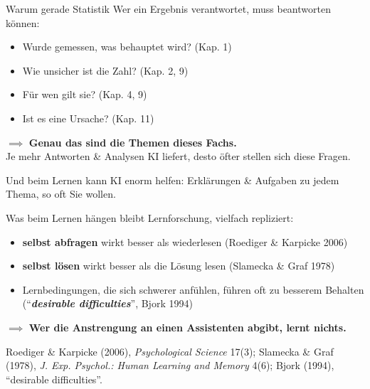 \documentclass[
  10pt,
  ignorenonframetext,
]{beamer}
\providecommand{\tightlist}{%
  \setlength{\itemsep}{0pt}\setlength{\parskip}{0pt}}
\begin{document}
\begin{frame}{Warum gerade Statistik}
\protect\hypertarget{warum-gerade-statistik}{}
Wer ein Ergebnis verantwortet, muss beantworten können:

\begin{itemize}
\tightlist
\item
  Wurde gemessen, was behauptet wird? (Kap. 1)
\item
  Wie unsicher ist die Zahl? (Kap. 2, 9)
\item
  Für wen gilt sie? (Kap. 4, 9)
\item
  Ist es eine Ursache? (Kap. 11)
\end{itemize}

\(\implies\) \textbf{Genau das sind die Themen dieses Fachs.}\\
Je mehr Antworten \& Analysen KI liefert, desto öfter stellen sich diese
Fragen.

Und beim Lernen kann KI enorm helfen: Erklärungen \& Aufgaben zu jedem
Thema, so oft Sie wollen.
\end{frame}

\begin{frame}{Was beim Lernen hängen bleibt}
\protect\hypertarget{was-beim-lernen-huxe4ngen-bleibt}{}
Lernforschung, vielfach repliziert:

\begin{itemize}
\tightlist
\item
  \textbf{selbst abfragen} wirkt besser als wiederlesen (Roediger \&
  Karpicke 2006)
\item
  \textbf{selbst lösen} wirkt besser als die Lösung lesen (Slamecka \&
  Graf 1978)
\item
  Lernbedingungen, die sich schwerer anfühlen, führen oft zu besserem
  Behalten\\
  (``\textbf{\emph{desirable difficulties}}'', Bjork 1994)
\end{itemize}

\(\implies\) \textbf{Wer die Anstrengung an einen Assistenten abgibt,
lernt nichts.}

\vspace{0pt plus 1filll}

\footnotesize Roediger \& Karpicke (2006), \emph{Psychological Science}
17(3); Slamecka \& Graf (1978), \emph{J. Exp. Psychol.: Human Learning
and Memory} 4(6); Bjork (1994), ``desirable difficulties''.
\end{frame}
\end{document}
